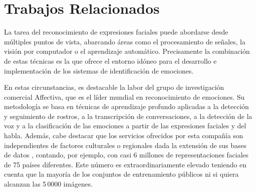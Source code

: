 \section{Trabajos Relacionados} \label{Chapter:RelatedWork}

La tarea del reconocimiento de expresiones faciales puede abordarse desde múltiples puntos de vista, abarcando áreas como el procesamiento de señales, la visión por computador o el aprendizaje automático. Precisamente la combinación de estas técnicas es la que ofrece el entorno idóneo para el desarrollo e implementación de los sistemas de identificación de emociones.

En estas circunstancias, es destacable la labor del grupo de investigación comercial Affectiva, que es el líder mundial en reconocimiento de emociones. Su metodología se basa en técnicas de aprendizaje profundo aplicadas a la detección y seguimiento de rostros, a la transcripción de conversaciones, a la detección de la voz y a la clasificación de las emociones a partir de las expresiones faciales y del habla. Además, cabe destacar que los servicios ofrecidos por esta compañía son independientes de factores culturales o regionales dada la extensión de sus bases de datos \cite{Affectiva}, contando, por ejemplo, con casi 6 millones de representaciones faciales de 75 países diferentes. Este número es extraordinariamente elevado teniendo en cuenta que la mayoría de los conjuntos de entrenamiento públicos ni si quiera alcanzan las 5\,0000 imágenes.


